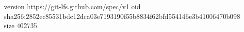 version https://git-lfs.github.com/spec/v1
oid sha256:2852ec85531bdc12dca03e7193190f55b8834f62bfd554146e3b41006470b098
size 402735
